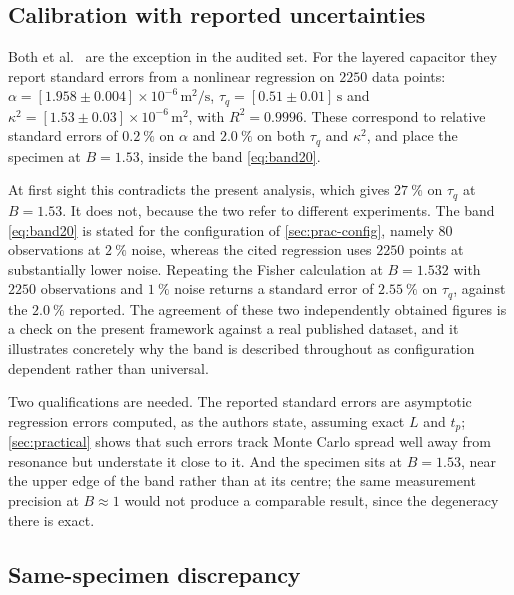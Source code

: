 \documentclass[preprint,12pt,a4paper]{elsarticle}
\theoremstyle{plain}
\theoremstyle{definition}
\theoremstyle{remark}
\newcommand{\tq}{\tau_{q}}
\newcommand{\kk}{\kappa^{2}}
\newcommand{\Bnum}{B}
\begin{document}
\subsection{Calibration with reported uncertainties}
\label{sec:cal-uncertainty}

Both et al.\ \cite{Both2016} are the exception in the audited set. For the
layered capacitor they report standard errors from a nonlinear regression on
$2250$ data points: $\alpha = [1.958 \pm 0.004]\times10^{-6}\,
\si{\metre\squared\per\second}$, $\tq = [0.51 \pm 0.01]\,\si{\second}$ and
$\kk = [1.53 \pm 0.03]\times10^{-6}\,\si{\metre\squared}$, with
$R^{2} = 0.9996$. These correspond to relative standard errors of
$\SI{0.2}{\percent}$ on $\alpha$ and $\SI{2.0}{\percent}$ on both $\tq$ and
$\kk$, and place the specimen at $\Bnum = 1.53$, inside the band
\eqref{eq:band20}.

At first sight this contradicts the present analysis, which gives
$\SI{27}{\percent}$ on $\tq$ at $\Bnum = 1.53$. It does not, because the two
refer to different experiments. The band \eqref{eq:band20} is stated for the
configuration of \cref{sec:prac-config}, namely $80$ observations at
$\SI{2}{\percent}$ noise, whereas the cited regression uses $2250$ points at
substantially lower noise. Repeating the Fisher calculation at
$\Bnum = 1.532$ with $2250$ observations and $\SI{1}{\percent}$ noise returns a
standard error of $\SI{2.55}{\percent}$ on $\tq$, against the
$\SI{2.0}{\percent}$ reported. The agreement of these two independently
obtained figures is a check on the present framework against a real published
dataset, and it illustrates concretely why the band is described throughout as
configuration dependent rather than universal.

Two qualifications are needed. The reported standard errors are asymptotic
regression errors computed, as the authors state, assuming exact $L$ and
$t_{p}$; \cref{sec:practical} shows that such errors track Monte Carlo spread
well away from resonance but understate it close to it. And the specimen sits
at $\Bnum = 1.53$, near the upper edge of the band rather than at its centre;
the same measurement precision at $\Bnum \approx 1$ would not produce a
comparable result, since the degeneracy there is exact.

\subsection{Same-specimen discrepancy}
\label{sec:cal-discrepancy}
\end{document}
